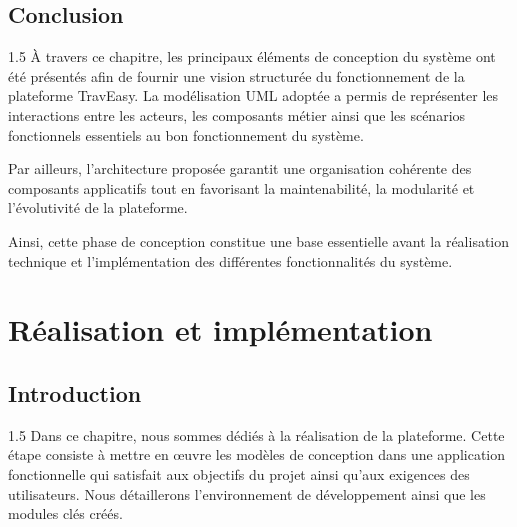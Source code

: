\documentclass[a4paper,12pt]{report}
\begin{document}
\section{Conclusion}
\vspace{0.5cm}
\begin{spacing}{1.5}
\justifying
À travers ce chapitre, les principaux éléments de conception du système ont été présentés afin de fournir une vision structurée du fonctionnement de la plateforme TravEasy. La modélisation UML adoptée a permis de représenter les interactions entre les acteurs, les composants métier ainsi que les scénarios fonctionnels essentiels au bon fonctionnement du système.

Par ailleurs, l'architecture proposée garantit une organisation cohérente des composants applicatifs tout en favorisant la maintenabilité, la modularité et l'évolutivité de la plateforme.

Ainsi, cette phase de conception constitue une base essentielle avant la réalisation technique et l'implémentation des différentes fonctionnalités du système.


\end{spacing}






\newpage
\chapter{ Réalisation et implémentation}
\newpage
\section{Introduction}
\vspace{0.5cm}
\begin{spacing}{1.5}
\justifying
Dans ce chapitre, nous sommes dédiés à la réalisation de la plateforme. Cette étape consiste à mettre en œuvre les modèles de conception dans une application fonctionnelle qui satisfait aux objectifs du projet ainsi qu'aux exigences des utilisateurs. Nous détaillerons l'environnement de développement ainsi que les modules clés créés.

\end{spacing}
\end{document}
